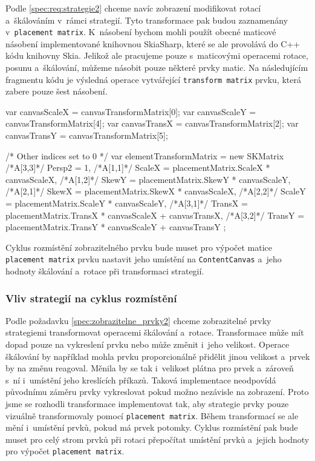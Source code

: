 \newpage
Podle \ref{spec:req:strategie2} chceme navíc zobrazení modifikovat rotací a~škálováním v~rámci strategií. Tyto transformace pak budou zaznamenány v~\texttt{placement matrix}. \linebreak K~násobení bychom mohli použít obecné maticové násobení implementované knihovnou SkiaSharp, které se ale provolává do C++ kódu knihovny Skia. Jelikož ale pracujeme pouze s~maticovými operacemi rotace, posunu a~škálování, můžeme násobit pouze některé prvky matic. Na následujícím fragmentu kódu je výsledná operace vytvářející \texttt{transform matrix} prvku, která zabere pouze šest násobení. 

\begin{csharpcode}
var canvasScaleX = canvasTransformMatrix[0]; 
var canvasScaleY = canvasTransformMatrix[4];
var canvasTransX = canvasTransformMatrix[2];
var canvasTransY = canvasTransformMatrix[5];

/* Other indices set to 0 */
var elementTransformMatrix = new SKMatrix { 
	/*A[3,3]*/ Persp2 = 1,
	/*A[1,1]*/ ScaleX = placementMatrix.ScaleX * canvasScaleX,
	/*A[1,2]*/ SkewY = placementMatrix.SkewY * canvasScaleY,
	/*A[2,1]*/ SkewX = placementMatrix.SkewX * canvasScaleX,
	/*A[2,2]*/ ScaleY = placementMatrix.ScaleY * canvasScaleY,
	/*A[3,1]*/ TransX = placementMatrix.TransX * canvasScaleX 
					    + canvasTransX,
	/*A[3,2]*/ TransY = placementMatrix.TransY * canvasScaleY 
						+ canvasTransY
};
\end{csharpcode}

Cyklus rozmístění zobrazitelného prvku bude muset pro výpočet matice \linebreak \texttt{placement matrix} prvku nastavit jeho umístění na \texttt{ContentCanvas} a~jeho hodnoty škálování a~rotace při transformaci strategií.

\subsubsection*{Vliv strategií na cyklus rozmístění}
Podle požadavku \ref{spec:zobrazitelne_prvky2} chceme zobrazitelné prvky strategiemi transformovat operacemi škálování a~rotace. Transformace může mít dopad pouze na vykreslení prvku nebo může změnit i~jeho velikost. Operace škálování by například mohla prvku proporcionálně přidělit jinou velikost a~prvek by na změnu reagoval. Měnila by se tak i~velikost plátna pro prvek a~zároveň s~ní i~umístění jeho kreslících příkazů. Taková implementace neodpovídá původnímu záměru prvky vykreslovat pokud možno nezávisle na zobrazení. Proto jsme se rozhodli transformace implementovat tak, aby strategie prvky pouze vizuálně transformovaly pomocí \texttt{placement matrix}. Během transformací se ale mění i~umístění prvků, pokud má prvek potomky. Cyklus rozmístění pak bude muset pro celý strom prvků při rotaci přepočítat umístění prvků a~jejich hodnoty pro výpočet \texttt{placement matrix}.

